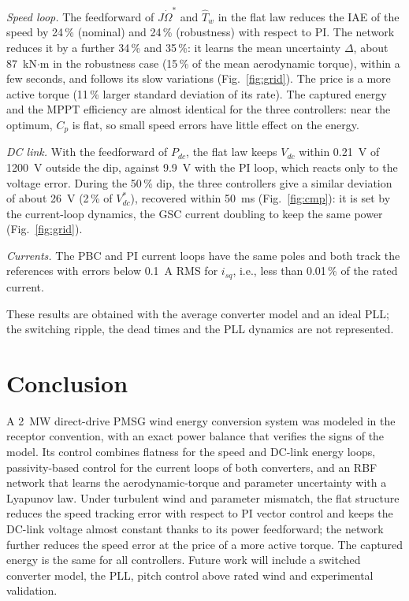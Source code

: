 \documentclass[conference]{IEEEtran}
\begin{document}
\emph{Speed loop.} The feedforward of $J\dot\Omega^*$ and $\hat T_w$ in the flat law reduces the IAE of
the speed by 24\,\% (nominal) and 24\,\% (robustness) with respect to PI.
The network reduces it by a further 34\,\% and 35\,\%: it learns the mean
uncertainty $\Delta$, about 87~kN$\cdot$m in the robustness case (15\,\% of the
mean aerodynamic torque), within a few seconds, and follows its slow variations (Fig.~\ref{fig:grid}).
The price is a more active torque (11\,\% larger standard deviation of its rate). The captured
energy and the MPPT efficiency are almost identical for the three controllers: near the optimum, $C_p$ is
flat, so small speed errors have little effect on the energy.

\emph{DC link.} With the feedforward of $P_{dc}$, the flat law keeps $V_{dc}$ within
0.21~V of 1200~V outside the dip, against 9.9~V with the PI loop, which reacts
only to the voltage error. During the 50\,\% dip, the three controllers give a similar deviation of
about 26~V (2\,\% of $V_{dc}^*$), recovered within 50~ms (Fig.~\ref{fig:cmp}): it is set by the
current-loop dynamics, the GSC current doubling to keep the same power (Fig.~\ref{fig:grid}).

\emph{Currents.} The PBC and PI current loops have the same poles and both track the references with
errors below 0.1~A RMS for $i_{sq}$, i.e., less than 0.01\,\% of the rated current.

These results are obtained with the average converter model and an ideal PLL; the switching ripple,
the dead times and the PLL dynamics are not represented.

\section{Conclusion}
A 2~MW direct-drive PMSG wind energy conversion system was modeled in the receptor convention, with an
exact power balance that verifies the signs of the model. Its control combines flatness for the speed
and DC-link energy loops, passivity-based control for the current loops of both converters, and an RBF
network that learns the aerodynamic-torque and parameter uncertainty with a Lyapunov law. Under
turbulent wind and parameter mismatch, the flat structure reduces the speed tracking error with respect
to PI vector control and keeps the DC-link voltage almost constant thanks to its power feedforward; the
network further reduces the speed error at the price of a more active torque. The captured energy is
the same for all controllers. Future work will include a switched converter model, the PLL, pitch
control above rated wind and experimental validation.
\end{document}

